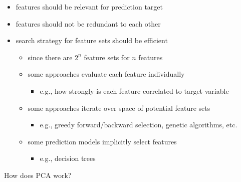 \documentclass[12pt]{article}
\begin{document}
\begin{itemize}[left=0pt, nosep]
	\item features should be relevant for prediction target
	\item features should not be redundant to each other
	\item search strategy for feature sets should be efficient
	\begin{itemize}[left=0pt, nosep]
		\item since there are $2^n$ feature sets for $n$ features
		\item some approaches evaluate each feature individually
		\begin{itemize}[left=0pt, nosep]
			\item e.g., how strongly is each feature correlated to target variable
		\end{itemize}
		\item some approaches iterate over space of potential feature sets
		\begin{itemize}[left=0pt, nosep]
			\item e.g., greedy forward/backward selection, genetic algorithms, etc.
		\end{itemize}
		\item some prediction models implicitly select features
		\begin{itemize}[left=0pt, nosep]
			\item e.g., decision trees
		\end{itemize}
	\end{itemize}
\end{itemize}

\begin{question}
	How does PCA work?
\end{question}
\end{document}
